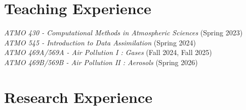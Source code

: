 \documentclass[margin,line]{resume}
\begin{document}
\begin{resume}
		\vspace*{-3mm}    
		
		
		
		\section{\mysidestyle \textbf{\textcolor{sep}{Teaching Experience}}}
		\textit{ATMO 430 - Computational Methods in Atmospheric Sciences} (Spring 2023) \\
		\textit{ATMO 545 - Introduction to Data Assimilation} (Spring 2024) \\
		\textit{ATMO 469A/569A - Air Pollution I : Gases} (Fall 2024, Fall 2025) \\
		\textit{ATMO 469B/569B - Air Pollution II : Aerosols} (Spring 2026) 
		
		\vspace{-0.4cm}
		
		\section{\mysidestyle \textbf{\textcolor{sep}{Research Experience}}}
		
		

\end{resume}
\end{document}
